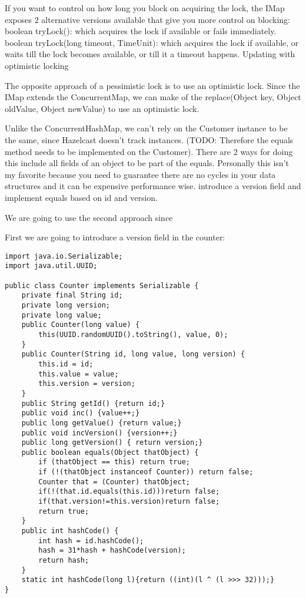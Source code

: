 If you want to control on how long you block on acquiring the lock, the IMap exposes 2 alternative versions available that give you more control on blocking:
boolean tryLock(): which acquires the lock if available or fails immediately.
boolean tryLock(long timeout, TimeUnit): which acquires the lock if available, or waits till the lock becomes available, or till it a timeout happens.  
Updating with optimistic locking

The opposite approach of a pessimistic lock is to use an optimistic lock. Since the IMap extends the ConcurrentMap, we can make of the replace(Object key, Object oldValue, Object newValue) to use an optimistic lock. 

Unlike the ConcurrentHashMap, we can't rely on the Customer instance to be the same, since Hazelcast doesn't track instances. (TODO: Therefore the equals method needs to be implemented on the Customer). There are 2 ways for doing this
include all fields of an object to be part of the equals. Personally this isn't my favorite because you need to guarantee there are no cycles in your data structures and it can be expensive performance wise.
introduce a version field and implement equals based on id and version.

We are going to use the second approach since

First we are going to introduce a version field in the counter:

\begin{verbatim}
import java.io.Serializable;
import java.util.UUID;

public class Counter implements Serializable {
    private final String id;
    private long version;
    private long value;
    public Counter(long value) {
        this(UUID.randomUUID().toString(), value, 0);
    }
    public Counter(String id, long value, long version) {
        this.id = id;
        this.value = value;
        this.version = version;
    }
    public String getId() {return id;}
    public void inc() {value++;}
    public long getValue() {return value;}
    public void incVersion() {version++;}
    public long getVersion() { return version;}
    public boolean equals(Object thatObject) {
        if (thatObject == this) return true;
        if (!(thatObject instanceof Counter)) return false;
        Counter that = (Counter) thatObject;
        if(!(that.id.equals(this.id)))return false;
        if(that.version!=this.version)return false;
        return true;
    }
    public int hashCode() {
        int hash = id.hashCode();
        hash = 31*hash + hashCode(version);
        return hash;
    }
    static int hashCode(long l){return ((int)(l ^ (l >>> 32)));}
}
\end{verbatim}

